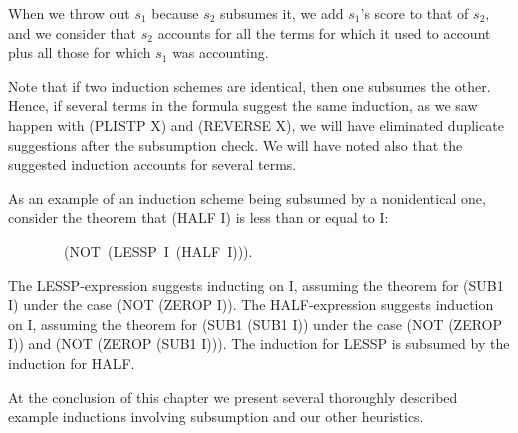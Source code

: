 \documentclass[11pt]{book}
\newenvironment{pubasis}{\begin{flushleft}\ttfamily\small}{\normalsize\rmfamily\end{flushleft}}
\begin{document}
When we throw out $s_{1}$ because $s_{2}$ subsumes it, we add $s_{1}$'s score to that of
$s_{2}$, and we consider that $s_{2}$  accounts for
all the terms for which it used to account plus all those for which $s_{1}$ was  accounting.

Note that if two induction schemes are identical, then one subsumes
the other.  Hence, if several terms in the formula suggest the same
induction, as we saw happen with (PLISTP X) and (REVERSE X), we
will have eliminated duplicate suggestions after the subsumption check.
We will have  noted also that the suggested induction accounts for
several terms.

As an example of an induction scheme being subsumed by a nonidentical
one, consider the theorem that (HALF I) is less than or equal to I:
\begin{pubasis}
~~~~~~~~(NOT~(LESSP~I~(HALF~I))).\\
\end{pubasis}
The LESSP-expression suggests inducting on I, assuming the theorem for
(SUB1 I) under the case (NOT (ZEROP I)).  The HALF-expression suggests
induction on I, assuming the theorem for (SUB1 (SUB1 I)) under the
case (NOT (ZEROP I)) and (NOT (ZEROP (SUB1 I))).  The induction for LESSP
is subsumed by the induction for HALF.

At the conclusion of this chapter we present several thoroughly
described example inductions involving subsumption and our other heuristics.
\end{document}
